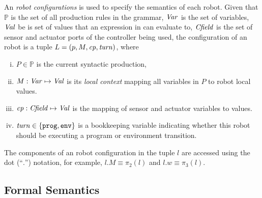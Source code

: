 An \emph{robot configurations} is used to specify the semantics of each robot.
Given that $\mathbb{P}$ is the set of all production rules in the \lgname grammar,
$\mathit{Var}$ is the set of variables, $\mathit{Val}$ be is set of values that an expression in \lgname can evaluate to,
$\mathit{Cfield}$ is the set of sensor and actuator ports of the controller being used,
the configuration of an robot is a tuple $L = (p, {M},\mathit{cp},\mathit{turn})$, where

\begin{enumerate}[i)]
\item $P \in \mathbb{P}$ is the current syntactic production,
\item ${M} : \mathit{Var} \mapsto \mathit{Val}$ is its \emph{local context} mapping all variables in $P$ to robot local values.
\item $\mathit{cp} : \mathit{Cfield} \mapsto \mathit{Val}$ is the mapping of sensor and actuator variables to values.
\item $\mathit{turn} \in \{\mathtt{prog,env}\}$ is a bookkeeping variable indicating whether this robot should be executing a program or environment transition.
\end{enumerate}

The components of an robot configuration in the tuple $l$ are accessed
using the dot (``$.$'') notation, for example, $l.M\equiv \pi_2(l)$ and $l.w \equiv \pi_3(l)$.


\subsection{Formal Semantics}\label{sec:semantics}

\newcommand{\EventRule}{\textsc{Event}\xspace}
\newcommand{\RunSysRule}{\textsc{RunSys}\xspace}
\newcommand{\EnvTransRule}{\textsc{EnvTrans}\xspace}
\newcommand{\RobotEnvToProgRule}{\textsc{RobotEnvToProg}\xspace}
\newcommand{\EnvToProgRule}{\textsc{EnvToProg}\xspace}
\newcommand{\exprule}{\rightarrow_E\xspace}
\newcommand{\stmtrule}{\rightarrow_\mathit{stmt}\xspace}
\newcommand{\sysrule}{\rightarrow_\mathit{Env}\xspace}
\newcommand{\progtrans}{\rightarrow_\mathit{prog}\xspace}
\newcommand{\envtrans}{\rightarrow_\mathit{env}\xspace}

